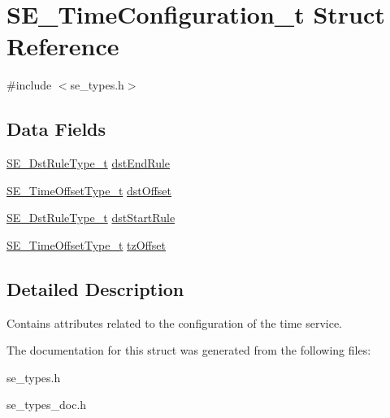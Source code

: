 \hypertarget{structSE__TimeConfiguration__t}{}\section{S\+E\+\_\+\+Time\+Configuration\+\_\+t Struct Reference}
\label{structSE__TimeConfiguration__t}


{\ttfamily \#include $<$se\+\_\+types.\+h$>$}

\subsection*{Data Fields}
\begin{DoxyCompactItemize}
\item 
\hyperlink{group__DstRuleType_ga215f3da52e2c5be95bc85b60e8702bcf}{S\+E\+\_\+\+Dst\+Rule\+Type\+\_\+t} \hyperlink{group__TimeConfiguration_gae87e7c6824261a50cda64560ae33fa4b}{dst\+End\+Rule}
\item 
\hyperlink{group__TimeOffsetType_ga3de71705a6723a1013cf383b705cbd8a}{S\+E\+\_\+\+Time\+Offset\+Type\+\_\+t} \hyperlink{group__TimeConfiguration_ga3bb6651aeebc25b17fbcd004bb0a5ffc}{dst\+Offset}
\item 
\hyperlink{group__DstRuleType_ga215f3da52e2c5be95bc85b60e8702bcf}{S\+E\+\_\+\+Dst\+Rule\+Type\+\_\+t} \hyperlink{group__TimeConfiguration_gaa5bec33fb7f397915e1c59e039876bb0}{dst\+Start\+Rule}
\item 
\hyperlink{group__TimeOffsetType_ga3de71705a6723a1013cf383b705cbd8a}{S\+E\+\_\+\+Time\+Offset\+Type\+\_\+t} \hyperlink{group__TimeConfiguration_ga2828faf061be8b3195d89dfbf7cb2b02}{tz\+Offset}
\end{DoxyCompactItemize}


\subsection{Detailed Description}
Contains attributes related to the configuration of the time service. 

The documentation for this struct was generated from the following files\+:\begin{DoxyCompactItemize}
\item 
se\+\_\+types.\+h\item 
se\+\_\+types\+\_\+doc.\+h\end{DoxyCompactItemize}
